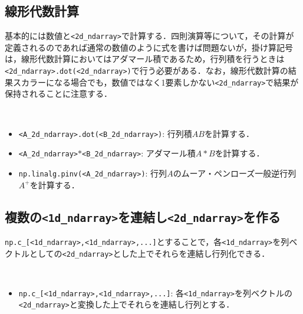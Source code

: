 \subsection{線形代数計算}

基本的には数値と\texttt{<2d\_ndarray>}で計算する．四則演算等について，その計算が定義されるのであれば通常の数値のように式を書けば問題ないが，掛け算記号は，線形代数計算においてはアダマール積であるため，行列積を行うときは\texttt{<2d\_ndarray>.dot(<2d\_ndarray>)}で行う必要がある．なお，線形代数計算の結果スカラーになる場合でも，数値ではなく1要素しかない\texttt{<2d\_ndarray>}で結果が保持されることに注意する．

\begin{gram}　
\begin{itemize}
\item \texttt{<A\_2d\_ndarray>.dot(<B\_2d\_ndarray>)}: 行列積$AB$を計算する．
\item \texttt{<A\_2d\_ndarray>$*$<B\_2d\_ndarray>}: アダマール積$A*B$を計算する．
\item \texttt{np.linalg.pinv(<A\_2d\_ndarray>)}: 行列$A$のムーア・ペンローズ一般逆行列$A^+$を計算する．
\end{itemize}
\end{gram}

\begin{cod}[\texttt{num6.py}]　
}]{code/num6.py}
\vspace{-10pt}
\begin{lstlisting}
F=
[[  78  156  234  312]
 [ 177  354  531  708]
 [ 276  552  828 1104]
 [ 375  750 1125 1500]]
G=
[[9040]]
H=
[[ -6  10]
 [ 12 -12]
 [-10   6]]
J=
[[0.16666667 0.16666667 0.16666667]
 [0.16666667 0.16666667 0.16666667]]
\end{lstlisting}
\end{cod}
\vspace{-10pt}

\subsection{複数の\texttt{<1d\_ndarray>}を連結し\texttt{<2d\_ndarray>}を作る}

\texttt{np.c\_[<1d\_ndarray>,<1d\_ndarray>,...]}とすることで，各\texttt{<1d\_ndarray>}を列ベクトルとしての\texttt{<2d\_ndarray>}とした上でそれらを連結し行列化できる．

\begin{gram}　
\begin{itemize}
\item \texttt{np.c\_[<1d\_ndarray>,<1d\_ndarray>,...]}: 各\texttt{<1d\_ndarray>}を列ベクトルの\texttt{<2d\_ndarray>}と変換した上でそれらを連結し行列とする．
\end{itemize}
\end{gram}

